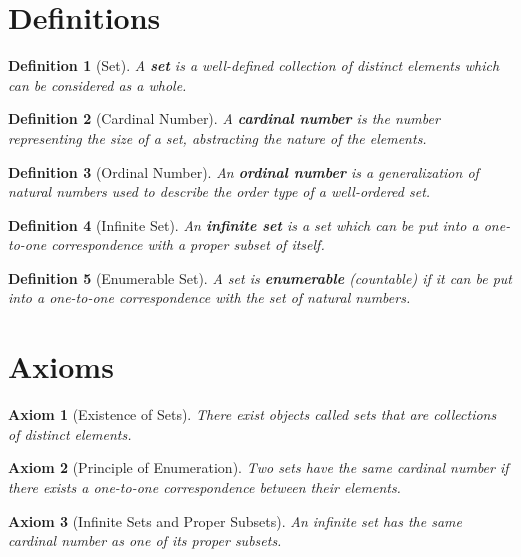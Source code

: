 \documentclass[11pt]{article}
\newtheorem{definition}{Definition}[section]
\newtheorem{axiom}{Axiom}[section]
\begin{document}

\section{Definitions}

\begin{definition}[Set]
A \textbf{set} is a well-defined collection of distinct elements which can be considered as a whole.
\end{definition}

\begin{definition}[Cardinal Number]
A \textbf{cardinal number} is the number representing the size of a set, abstracting the nature of the elements.
\end{definition}

\begin{definition}[Ordinal Number]
An \textbf{ordinal number} is a generalization of natural numbers used to describe the order type of a well-ordered set.
\end{definition}

\begin{definition}[Infinite Set]
An \textbf{infinite set} is a set which can be put into a one-to-one correspondence with a proper subset of itself.
\end{definition}

\begin{definition}[Enumerable Set]
A set is \textbf{enumerable} (countable) if it can be put into a one-to-one correspondence with the set of natural numbers.
\end{definition}

\section{Axioms}

\begin{axiom}[Existence of Sets]
There exist objects called sets that are collections of distinct elements.
\end{axiom}

\begin{axiom}[Principle of Enumeration]
Two sets have the same cardinal number if there exists a one-to-one correspondence between their elements.
\end{axiom}

\begin{axiom}[Infinite Sets and Proper Subsets]
An infinite set has the same cardinal number as one of its proper subsets.
\end{axiom}
\end{document}
